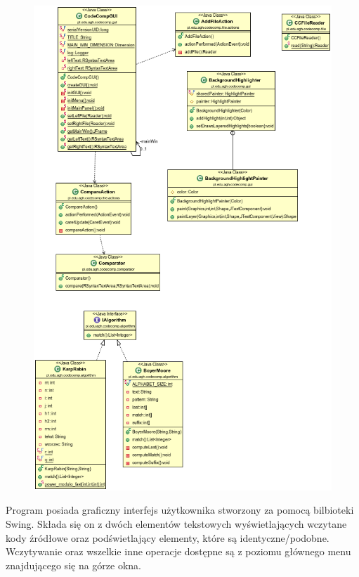 \documentclass[a4paper,12pt]{article}
\begin{document}
\begin{figure}[!]
\centering
\includegraphics[scale=0.6]{gfx/classdiagram.png}
\end{figure}

\pagebreak

Program posiada graficzny interfejs użytkownika stworzony za pomocą bilbioteki Swing. Składa się on z dwóch elementów tekstowych wyświetlających wczytane kody źródłowe oraz podświetlający elementy, które są identyczne/podobne. Wczytywanie oraz wszelkie inne operacje dostępne są z poziomu głównego menu znajdującego się na górze okna.
\end{document}
